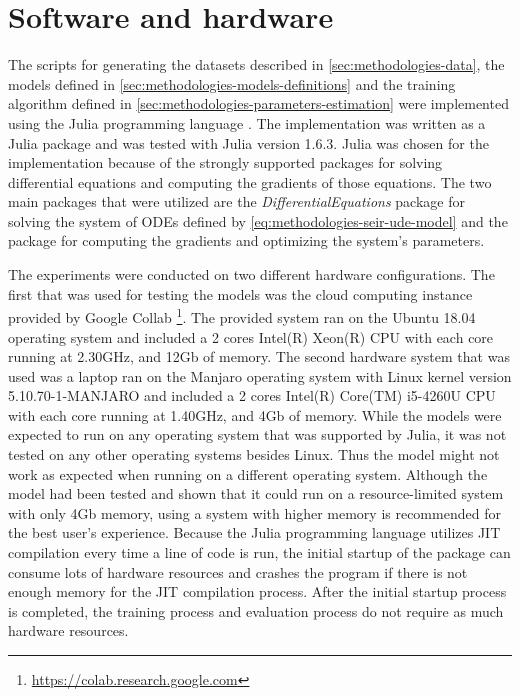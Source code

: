 \section{Software and hardware}

The scripts for generating the datasets described in \autoref{sec:methodologies-data}, the models defined in \autoref{sec:methodologies-models-definitions} and the training algorithm defined in \autoref{sec:methodologies-parameters-estimation} were implemented using the Julia programming language \cite{bezanson2012julia}.
The implementation was written as a Julia package and was tested with Julia version 1.6.3.
Julia was chosen for the implementation because of the strongly supported packages for solving differential equations and computing the gradients of those equations.
The two main packages that were utilized are the \textit{DifferentialEquations} package \cite{rackauckas2017differentialequations} for solving the system of \glspl{ODE} defined by \autoref{eq:methodologies-seir-ude-model} and the  \cite{rackauckasUniversalDifferentialEquations2020} package for computing the gradients and optimizing the system's parameters.

The experiments were conducted on two different hardware configurations.
The first that was used for testing the models was the cloud computing instance provided by Google Collab \footnote{\url{https://colab.research.google.com}}.
The provided system ran on the Ubuntu 18.04 operating system and included a 2 cores Intel(R) Xeon(R) CPU with each core running at 2.30GHz, and 12Gb of memory.
The second hardware system that was used was a laptop ran on the Manjaro operating system with Linux kernel version 5.10.70-1-MANJARO and included a 2 cores Intel(R) Core(TM) i5-4260U CPU with each core running at 1.40GHz, and 4Gb of memory.
While the models were expected to run on any operating system that was supported by Julia, it was not tested on any other operating systems besides Linux.
Thus the model might not work as expected when running on a different operating system.
Although the model had been tested and shown that it could run on a resource-limited system with only 4Gb memory, using a system with higher memory is recommended for the best user's experience.
Because the Julia programming language utilizes \gls{JIT} compilation every time a line of code is run, the initial startup of the package can consume lots of hardware resources and crashes the program if there is not enough memory for the \gls{JIT} compilation process.
After the initial startup process is completed, the training process and evaluation process do not require as much hardware resources.